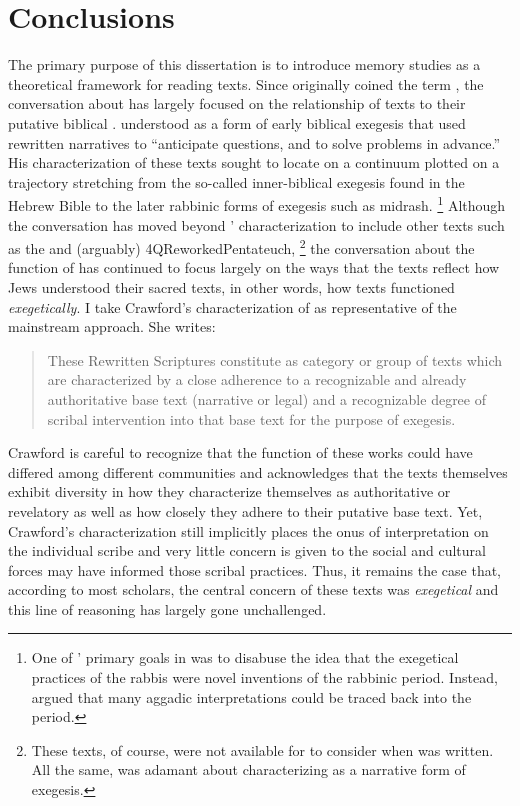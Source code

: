 
\chapter*{Conclusions}


The primary purpose of this dissertation is to introduce memory studies as a theoretical framework for reading \rwb texts. Since \Vermes originally coined the term \rwb, the conversation about \rwb has largely focused on the relationship of \rwb texts to their putative biblical \vorlagen. \vermes understood \rwb as a form of early biblical exegesis that used rewritten narratives to ``anticipate questions, and to solve problems in advance.''%
    \autocite[95]{vermes1961}
His characterization of these texts sought to locate \rwb on a continuum plotted on a trajectory stretching from the so-called inner-biblical exegesis found in the Hebrew Bible to the later rabbinic forms of exegesis such as midrash.%
    \footnote{One of \vermes' primary goals in  was to disabuse the idea that the exegetical practices of the rabbis were novel inventions of the rabbinic period. Instead, \vermes argued that many aggadic interpretations could be traced back into the \secondtemple period.}
Although the conversation has moved beyond \vermes' characterization to include other texts such as the \templescroll and (arguably) 4QReworkedPentateuch,%
    \footnote{These texts, of course, were not available for \vermes to consider when  was written. All the same, \vermes was adamant about characterizing \rwb as a narrative form of exegesis.}    
the conversation about the function of \rwb has continued to focus largely on the ways that the \rwb texts reflect how \secondtemple Jews understood their sacred texts, in other words, how \rwb texts functioned \emph{exegetically}. I take Crawford's characterization of  \rwb as representative of the mainstream approach. She writes:
\begin{quote}
    These Rewritten Scriptures constitute as category or group of texts which are characterized by a close adherence to a recognizable and already authoritative base text (narrative or legal) and a recognizable degree of scribal intervention into that base text for the purpose of exegesis.\autocite[12--13]{crawford2008}
\end{quote}
\noindent
Crawford is careful to recognize that the function of these works could have differed among different communities and acknowledges that the texts themselves exhibit diversity in how they characterize themselves as authoritative or revelatory as well as how closely they adhere to their putative base text.%
    \autocite[13]{crawford2008}
Yet, Crawford's characterization still implicitly places the onus of interpretation on the individual scribe and very little concern is given to the social and cultural forces may have informed those scribal practices. Thus, it remains the case that, according to most scholars, the central concern of these texts was \emph{exegetical} and this line of reasoning has largely gone unchallenged. 

